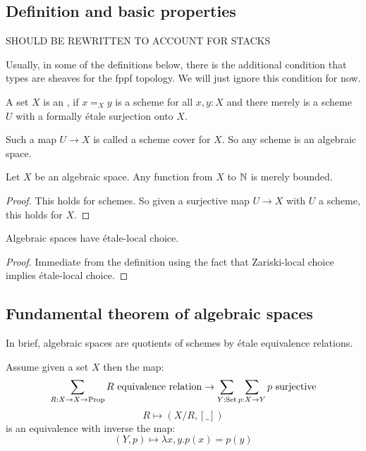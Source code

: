 \subsection{Definition and basic properties}

SHOULD BE REWRITTEN TO ACCOUNT FOR STACKS

Usually, in some of the definitions below,
there is the additional condition that types are sheaves for the fppf topology.
We will just ignore this condition for now.

\begin{definition}
  A set $X$ is an ,
  if $x=_Xy$ is a scheme for all $x,y:X$ and
  there merely is a scheme $U$ with a formally étale surjection onto $X$.
\end{definition}

Such a map $U\to X$ is called a scheme cover for $X$. So any scheme is an algebraic space.

\begin{lemma}
Let $X$ be an algebraic space. Any function from $X$ to $\mathbb{N}$ is merely bounded.
\end{lemma}

\begin{proof}
  This holds for schemes.
  So given a surjective map $U\to X$ with $U$ a scheme, this holds for $X$.
\end{proof}

\begin{lemma}
Algebraic spaces have étale-local choice.
\end{lemma}

\begin{proof}
Immediate from the definition using the fact that Zariski-local choice implies étale-local choice.
\end{proof}

\subsection{Fundamental theorem of algebraic spaces}

In brief, algebraic spaces are quotients of schemes by étale equivalence relations.

\begin{lemma}\label{quotient-by-equivalence-relation}
Assume given a set $X$ then the map:
\[ \sum_{R:X\to X\to \Prop} R\ \mathrm{equivalence\ relation} \to \sum_{Y:\mathrm{Set}} \sum_{p:X\to Y} p\ \mathrm{surjective}\]
\[R \mapsto (X/R,[\_])\]
is an equivalence with inverse the map:
\[(Y,p) \mapsto \lambda x,y. p(x)=p(y)\]
\end{lemma}

